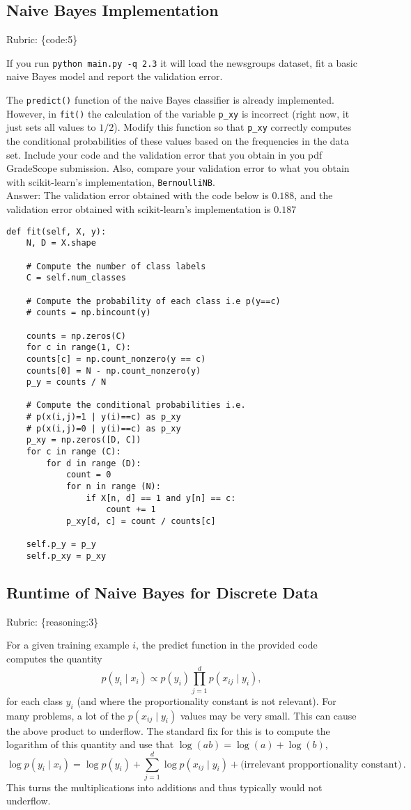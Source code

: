 \documentclass{article}
\def\rubric#1{\gre{Rubric: \{#1\}}}{}
\def\blu#1{{\color{blu}#1}}
\def\gre#1{{\color{gre}#1}}
\def\cond{\; | \;}
\def\ans#1{\gre{Answer: #1}}{}
\begin{document}
\subsection{Naive Bayes Implementation}
\rubric{code:5}

If you run \texttt{python main.py -q 2.3}
it will load the newsgroups dataset, fit a basic naive Bayes model and report the validation error.

The \texttt{predict()} function of the naive Bayes classifier is already implemented.
However, in \texttt{fit()}
the calculation of the variable \texttt{p\_xy} is incorrect
(right now, it just sets all values to $1/2$).
\blu{Modify this function so that \texttt{p\_xy} correctly
computes the conditional probabilities of these values based on the
frequencies in the data set. Include your code and the validation error that you obtain in you pdf GradeScope submission.
Also, compare your validation error to what you obtain with scikit-learn's implementation, \texttt{BernoulliNB}.} \\
\ans{The validation error obtained with the code below is $0.188$, and the validation error obtained with scikit-learn's implementation is $0.187$}
\begin{lstlisting}[style=base]
def fit(self, X, y):
	N, D = X.shape
	
	# Compute the number of class labels
	C = self.num_classes
	
	# Compute the probability of each class i.e p(y==c)
	# counts = np.bincount(y)
	
	counts = np.zeros(C)
	for c in range(1, C):
	counts[c] = np.count_nonzero(y == c)
	counts[0] = N - np.count_nonzero(y)
	p_y = counts / N
	
	# Compute the conditional probabilities i.e.
	# p(x(i,j)=1 | y(i)==c) as p_xy
	# p(x(i,j)=0 | y(i)==c) as p_xy
	p_xy = np.zeros([D, C])
	for c in range (C):
		for d in range (D):
			count = 0
			for n in range (N):
				if X[n, d] == 1 and y[n] == c:
					count += 1
			p_xy[d, c] = count / counts[c]		
	
	self.p_y = p_y
	self.p_xy = p_xy

\end{lstlisting}

\subsection{Runtime of Naive Bayes for Discrete Data}
\rubric{reasoning:3}

For a given training example $i$, the predict function in the provided code computes the quantity
\[
p(y_i \cond x_i) \propto p(y_i)\prod_{j=1}^d p(x_{ij} \cond y_i),
\]
for each class $y_i$ (and where the proportionality constant is not relevant). For many problems, a lot of the $p(x_{ij} \cond y_i)$ values may be very small. This can cause the above product to underflow. The standard fix for this is to compute the logarithm of this quantity and use that $\log(ab) = \log(a)+\log(b)$,
\[
\log p(y_i \cond x_i) = \log p(y_i) + \sum_{j=1}^d \log p(x_{ij} \cond y_i) + \text{(irrelevant propportionality constant)} \, .
\]
This turns the multiplications into additions and thus typically would not underflow.
\end{document}
